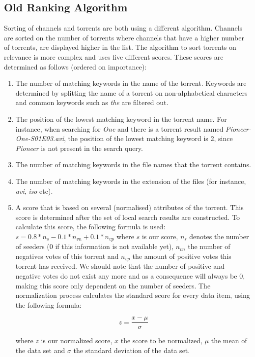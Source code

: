 \subsection{Old Ranking Algorithm}
Sorting of channels and torrents are both using a different algorithm. Channels are sorted on the number of torrents where channels that have a higher number of torrents, are displayed higher in the list. The algorithm to sort torrents on relevance is more complex and uses five different scores. These scores are determined as follows (ordered on importance):
\begin{enumerate}
	\item The number of matching keywords in the name of the torrent. Keywords are determined by splitting the name of a torrent on non-alphabetical characters and common keywords such as \emph{the} are filtered out.
	\item The position of the lowest matching keyword in the torrent name. For instance, when searching for \emph{One} and there is a torrent result named \emph{Pioneer-One-S01E03.avi}, the position of the lowest matching keyword is 2, since \emph{Pioneer} is not present in the search query.
	\item The number of matching keywords in the file names that the torrent contains.
	\item The number of matching keywords in the extension of the files (for instance, \emph{avi}, \emph{iso} etc).
	\item A score that is based on several (normalised) attributes of the torrent. This score is determined after the set of local search results are constructed. To calculate this score, the following formula is used: $ s = 0.8 * n_s - 0.1 * n_{vn} + 0.1 * n_{vp} $ where $ s $ is our score, $ n_s $ denotes the number of seeders (0 if this information is not available yet), $ n_{vn} $ the number of negatives votes of this torrent and $ n_{vp} $ the amount of positive votes this torrent has received. We should note that the number of positive and negative votes do not exist any more and as a consequence will always be 0, making this score only dependent on the number of seeders. The normalization process calculates the standard score for every data item, using the following formula:
	
	\begin{equation}
	\label{eq:normalization-standard-score}
	z = \frac{x - \mu}{\sigma}
	\end{equation}
	
	where $ z $ is our normalized score, $ x $ the score to be normalized, $ \mu $ the mean of the data set and $ \sigma $ the standard deviation of the data set.
	
\end{enumerate}
